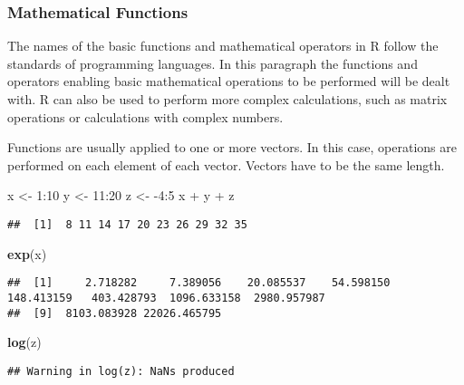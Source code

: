 \documentclass[]{book}
\newenvironment{Shaded}{\begin{snugshade}}{\end{snugshade}}
\newcommand{\KeywordTok}[1]{\textcolor[rgb]{0.13,0.29,0.53}{\textbf{{#1}}}}
\newcommand{\DecValTok}[1]{\textcolor[rgb]{0.00,0.00,0.81}{{#1}}}
\newcommand{\StringTok}[1]{\textcolor[rgb]{0.31,0.60,0.02}{{#1}}}
\newcommand{\NormalTok}[1]{{#1}}
\begin{document}
\subsubsection{Mathematical Functions}\label{mathematical-functions}

The names of the basic functions and mathematical operators in R follow
the standards of programming languages. In this paragraph the functions
and operators enabling basic mathematical operations to be performed
will be dealt with. R can also be used to perform more complex
calculations, such as matrix operations or calculations with complex
numbers.

Functions are usually applied to one or more vectors. In this case,
operations are performed on each element of each vector. Vectors have to
be the same length.

\begin{Shaded}
\begin{Highlighting}[]
\NormalTok{x <-}\StringTok{ }\DecValTok{1}\NormalTok{:}\DecValTok{10}
\NormalTok{y <-}\StringTok{ }\DecValTok{11}\NormalTok{:}\DecValTok{20}
\NormalTok{z <-}\StringTok{ }\NormalTok{-}\DecValTok{4}\NormalTok{:}\DecValTok{5}
\NormalTok{x +}\StringTok{ }\NormalTok{y +}\StringTok{ }\NormalTok{z}
\end{Highlighting}
\end{Shaded}

\begin{verbatim}
##  [1]  8 11 14 17 20 23 26 29 32 35
\end{verbatim}

\begin{Shaded}
\begin{Highlighting}[]
\KeywordTok{exp}\NormalTok{(x)}
\end{Highlighting}
\end{Shaded}

\begin{verbatim}
##  [1]     2.718282     7.389056    20.085537    54.598150   148.413159   403.428793  1096.633158  2980.957987
##  [9]  8103.083928 22026.465795
\end{verbatim}

\begin{Shaded}
\begin{Highlighting}[]
\KeywordTok{log}\NormalTok{(z)}
\end{Highlighting}
\end{Shaded}

\begin{verbatim}
## Warning in log(z): NaNs produced
\end{verbatim}
\end{document}
